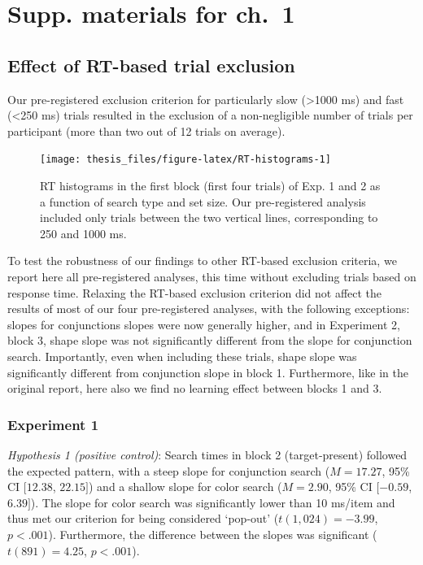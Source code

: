 \documentclass[12pt,twoside]{reedthesis}
\begin{document}
\hypertarget{app1:RT}{%
\chapter{Supp. materials for ch.~1}\label{app1:RT}}

\hypertarget{effect-of-rt-based-trial-exclusion}{%
\section{Effect of RT-based trial exclusion}\label{effect-of-rt-based-trial-exclusion}}

Our pre-registered exclusion criterion for particularly slow (\textgreater1000 ms) and fast (\textless250 ms) trials resulted in the exclusion of a non-negligible number of trials per participant (more than two out of 12 trials on average).
\begin{figure}
\texttt{[image: thesis\_files/figure-latex/RT-histograms-1]} \caption[Uncensored search time histograms]{RT histograms in the first block (first four trials) of Exp. 1 and 2 as a function of search type and set size. Our pre-registered analysis included only trials between the two vertical lines, corresponding to 250 and 1000 ms.}\label{fig:RT-histograms}
\end{figure}
To test the robustness of our findings to other RT-based exclusion criteria, we report here all pre-registered analyses, this time without excluding trials based on response time. Relaxing the RT-based exclusion criterion did not affect the results of most of our four pre-registered analyses, with the following exceptions: slopes for conjunctions slopes were now generally higher, and in Experiment 2, block 3, shape slope was not significantly different from the slope for conjunction search. Importantly, even when including these trials, shape slope was significantly different from conjunction slope in block 1. Furthermore, like in the original report, here also we find no learning effect between blocks 1 and 3.

\hypertarget{experiment-1-2}{%
\subsection{Experiment 1}\label{experiment-1-2}}

\emph{Hypothesis 1 (positive control)}: Search times in block 2 (target-present) followed the expected pattern, with a steep slope for conjunction search (\(M = 17.27\), 95\% CI \([12.38\), \(22.15]\)) and a shallow slope for color search (\(M = 2.90\), 95\% CI \([-0.59\), \(6.39]\)). The slope for color search was significantly lower than 10 ms/item and thus met our criterion for being considered `pop-out' (\(t(1,024) = -3.99\), \(p < .001\)). Furthermore, the difference between the slopes was significant (\(t(891) = 4.25\), \(p < .001\)).
\end{document}
